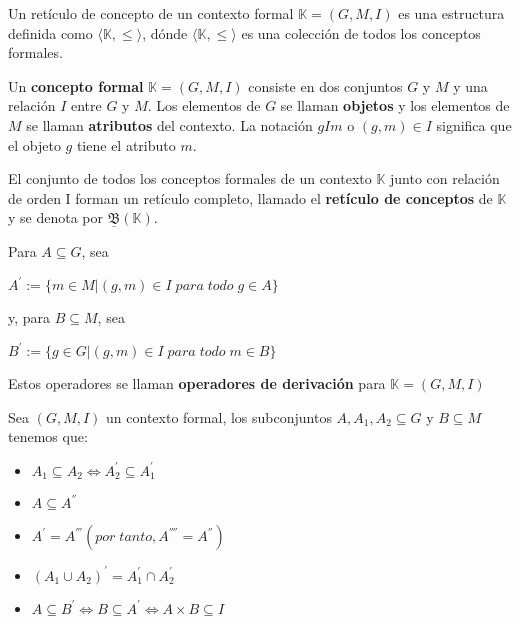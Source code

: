 \documentclass[../../main.tex]{subfiles}
\begin{document}
\begin{definicion}
Un retículo de concepto de un contexto formal $\mathbb{K} = (G, M, I)$ es una estructura definida como $\langle \mathbb{K}, \leq \rangle$, dónde $\langle \mathbb{K}, \leq \rangle$ es una colección de todos los conceptos formales.
\end{definicion}

\begin{definicion}
Un \textbf{concepto formal} $\mathbb{K} = (G, M, I)$ consiste en dos conjuntos $G$ y $M$ y una relación $I$ entre $G$ y $M$. Los elementos de $G$ se llaman \textbf{objetos} y los elementos de $M$ se llaman \textbf{atributos} del contexto. La notación $gIm$ o $(g, m) \in I$ significa que el objeto $g$ tiene el atributo $m$.
\end{definicion}


\begin{teorema}
El conjunto de todos los conceptos formales de un contexto $\mathbb{K}$ junto con relación de orden I forman un retículo completo, llamado el \textbf{retículo de conceptos} de $\mathbb{K}$ y se denota por $\underline{\mathfrak{B}}(\mathbb{K})$.
\end{teorema}


\begin{definicion}
Para $A \subseteq G$, sea
\begin{center}
    $A^{'} := { \{m \in M | (g, m) \in I\;para\;todo\;g \in A\} }$
\end{center}
y, para $B \subseteq M$, sea
\begin{center}
    $B^{'} := { \{g \in G | (g, m) \in I\;para\;todo\;m \in B\} }$
\end{center}
\end{definicion}
Estos operadores se llaman \textbf{operadores de derivación} para $\mathbb{K} = (G, M, I)$


\begin{teorema}
Sea $(G, M, I)$ un contexto formal, los subconjuntos $A, A_1, A_2 \subseteq G$ y $B \subseteq M$ tenemos que:
\begin{itemize}
    \item $A_1 \subseteq A_2 \Longleftrightarrow A_2^{'} \subseteq A_1^{'}$
    \item $A \subseteq A^{''}$
    \item $A^{'} = A^{'''} (por\;tanto, A^{''''} = A^{''})$
    \item $(A_1 \cup A_2)^{'} = A_1^{'} \cap A_2^{'}$
    \item $A \subseteq B^{'} \Longleftrightarrow B \subseteq A^{'} \Longleftrightarrow A \times B \subseteq I$
\end{itemize}
\end{teorema}
\end{document}
